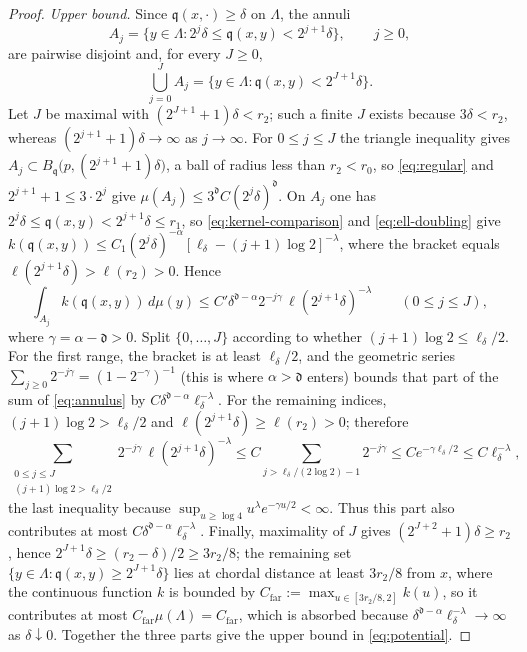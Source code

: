 \documentclass[12pt,oneside,a4paper]{article}
\theoremstyle{mytheorem}
\theoremstyle{remark}
\theoremstyle{definition}
\begin{document}
\begin{proof}
\emph{Upper bound.}  Since $\mathfrak q(x,\cdot)\ge\delta$ on $\Lambda$,
the annuli
\[
A_j=\{y\in\Lambda:2^j\delta\le \mathfrak q(x,y)<2^{j+1}\delta\},
\qquad j\ge0,
\]
are pairwise disjoint and, for every $J\ge0$,
\[
\bigcup_{j=0}^{J}A_j
=\{y\in\Lambda:\mathfrak q(x,y)<2^{J+1}\delta\}.
\]
Let $J$ be maximal with $(2^{J+1}+1)\delta<r_2$; such a finite $J$
exists because $3\delta<r_2$, whereas
$(2^{j+1}+1)\delta\to\infty$ as $j\to\infty$.  For $0\le j\le J$ the
triangle inequality gives
$A_j\subset B_{\mathfrak q}\bigl(p,(2^{j+1}+1)\delta\bigr)$, a ball of radius less
than $r_2<r_0$, so \eqref{eq:regular} and $2^{j+1}+1\le3\cdot2^j$ give
$\mu(A_j)\le3^{\mathfrak d}C(2^j\delta)^{\mathfrak d}$.  On $A_j$ one has
$2^j\delta\le \mathfrak q(x,y)<2^{j+1}\delta\le r_1$, so
\eqref{eq:kernel-comparison} and \eqref{eq:ell-doubling} give
$k(\mathfrak q(x,y))\le
C_1(2^j\delta)^{-\alpha}[\ell_\delta-(j+1)\log2]^{-\lambda}$,
where the bracket equals $\ell(2^{j+1}\delta)>\ell(r_2)>0$.  Hence
\begin{equation}\label{eq:annulus}
 \int_{A_j}k(\mathfrak q(x,y))\,d\mu(y)
 \le C'\delta^{\mathfrak d-\alpha}2^{-j\gamma}\,\ell(2^{j+1}\delta)^{-\lambda}
 \qquad(0\le j\le J),
\end{equation}
where $\gamma=\alpha-\mathfrak d>0$.  Split $\{0,\dots,J\}$ according to whether
$(j+1)\log2\le \ell_\delta/2$.  For the first range, the bracket is at least
$\ell_\delta/2$, and the geometric series
$\sum_{j\ge0}2^{-j\gamma}=(1-2^{-\gamma})^{-1}$ (this is where
$\alpha>\mathfrak d$ enters) bounds that part of the sum of \eqref{eq:annulus}
by $C\delta^{\mathfrak d-\alpha}\ell_\delta^{-\lambda}$.  For the remaining indices,
$(j+1)\log2>\ell_\delta/2$ and
$\ell(2^{j+1}\delta)\ge\ell(r_2)>0$; therefore
\[
 \sum_{\substack{0\le j\le J\\(j+1)\log2>\ell_\delta/2}}
 2^{-j\gamma}\,\ell(2^{j+1}\delta)^{-\lambda}
 \le C\!\!\sum_{j>\ell_\delta/(2\log2)-1}\!\!2^{-j\gamma}
 \le Ce^{-\gamma \ell_\delta/2}
 \le C\ell_\delta^{-\lambda},
\]
the last inequality because
$\sup_{u\ge\log4}u^{\lambda}e^{-\gamma u/2}<\infty$.  Thus this part
also contributes at most
$C\delta^{\mathfrak d-\alpha}\ell_\delta^{-\lambda}$.  Finally,
maximality of $J$ gives $(2^{J+2}+1)\delta\ge r_2$, hence
$2^{J+1}\delta\ge(r_2-\delta)/2\ge3r_2/8$; the remaining set
$\{y\in\Lambda:\mathfrak q(x,y)\ge2^{J+1}\delta\}$ lies at chordal distance at
least $3r_2/8$ from $x$, where the continuous function $k$ is bounded
by $C_{\mathrm{far}}:=\max_{u\in[3r_2/8,2]}k(u)$, so it contributes at most
$C_{\mathrm{far}}\mu(\Lambda)=C_{\mathrm{far}}$, which is absorbed because
$\delta^{\mathfrak d-\alpha}\ell_\delta^{-\lambda}\to\infty$ as
$\delta\downarrow0$.
Together the three parts give the upper bound in
\eqref{eq:potential}.
\end{proof}
\end{document}
